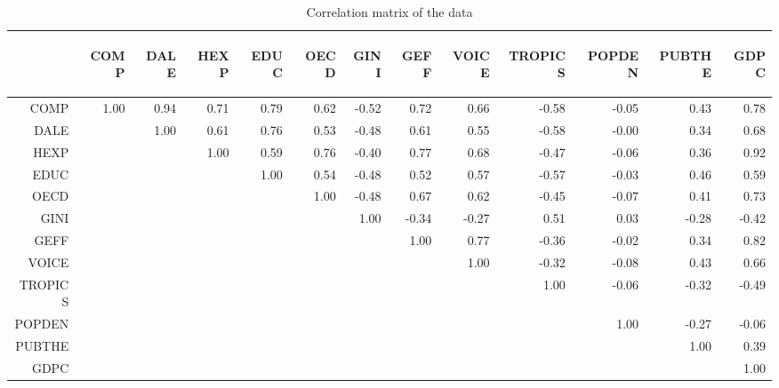 \documentclass[12pt,a4paper]{article}\usepackage[]{graphicx}\usepackage[]{color}
\begin{document}
\begin{table}[ht]
\centering
\begingroup\scriptsize
\begin{tabular}{rrrrrrrrrrrrr}
  \hline
 & \begin{sideways} COMP \end{sideways} & \begin{sideways} DALE \end{sideways} & \begin{sideways} HEXP \end{sideways} & \begin{sideways} EDUC \end{sideways} & \begin{sideways} OECD \end{sideways} & \begin{sideways} GINI \end{sideways} & \begin{sideways} GEFF \end{sideways} & \begin{sideways} VOICE \end{sideways} & \begin{sideways} TROPICS \end{sideways} & \begin{sideways} POPDEN \end{sideways} & \begin{sideways} PUBTHE \end{sideways} & \begin{sideways} GDPC \end{sideways} \\ 
  \hline
COMP & 1.00 & 0.94 & 0.71 & 0.79 & 0.62 & -0.52 & 0.72 & 0.66 & -0.58 & -0.05 & 0.43 & 0.78 \\ 
  DALE &  & 1.00 & 0.61 & 0.76 & 0.53 & -0.48 & 0.61 & 0.55 & -0.58 & -0.00 & 0.34 & 0.68 \\ 
  HEXP &  &  & 1.00 & 0.59 & 0.76 & -0.40 & 0.77 & 0.68 & -0.47 & -0.06 & 0.36 & 0.92 \\ 
  EDUC &  &  &  & 1.00 & 0.54 & -0.48 & 0.52 & 0.57 & -0.57 & -0.03 & 0.46 & 0.59 \\ 
  OECD &  &  &  &  & 1.00 & -0.48 & 0.67 & 0.62 & -0.45 & -0.07 & 0.41 & 0.73 \\ 
  GINI &  &  &  &  &  & 1.00 & -0.34 & -0.27 & 0.51 & 0.03 & -0.28 & -0.42 \\ 
  GEFF &  &  &  &  &  &  & 1.00 & 0.77 & -0.36 & -0.02 & 0.34 & 0.82 \\ 
  VOICE &  &  &  &  &  &  &  & 1.00 & -0.32 & -0.08 & 0.43 & 0.66 \\ 
  TROPICS &  &  &  &  &  &  &  &  & 1.00 & -0.06 & -0.32 & -0.49 \\ 
  POPDEN &  &  &  &  &  &  &  &  &  & 1.00 & -0.27 & -0.06 \\ 
  PUBTHE &  &  &  &  &  &  &  &  &  &  & 1.00 & 0.39 \\ 
  GDPC &  &  &  &  &  &  &  &  &  &  &  & 1.00 \\ 
   \hline
\end{tabular}
\endgroup
\caption{Correlation matrix of the data} 
\label{tab:cor}
\end{table}
\end{document}
